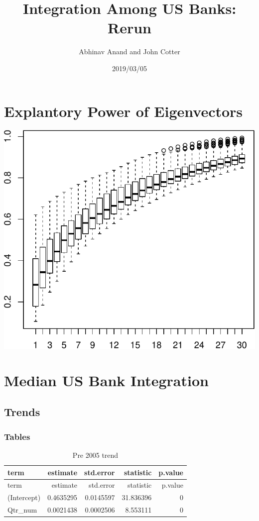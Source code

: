 \documentclass[11pt,]{article}
\title{Integration Among US Banks: Rerun}
\author{Abhinav Anand and John Cotter}
\date{2019/03/05}
\begin{document}
\maketitle

\section{Explantory Power of
Eigenvectors}\label{explantory-power-of-eigenvectors}

\begin{center}\includegraphics{AC_US_Bank_Int_Results_1_files/figure-latex/expl_power_eig_vec-1} \end{center}

\section{Median US Bank Integration}\label{median-us-bank-integration}

\subsection{Trends}\label{trends}

\subsubsection{Tables}\label{tables}

\begin{longtable}[]{@{}lrrrr@{}}
\caption{Pre 2005 trend}\tabularnewline
\toprule
term & estimate & std.error & statistic & p.value\tabularnewline
\midrule
\endfirsthead
\toprule
term & estimate & std.error & statistic & p.value\tabularnewline
\midrule
\endhead
(Intercept) & 0.4635295 & 0.0145597 & 31.836396 & 0\tabularnewline
Qtr\_num & 0.0021438 & 0.0002506 & 8.553111 & 0\tabularnewline
\bottomrule
\end{longtable}
\end{document}
